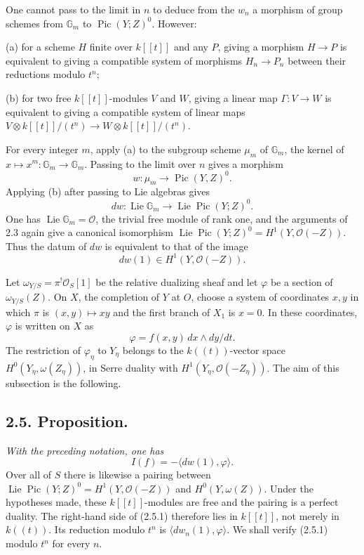 \documentclass[11pt,leqno]{article}
\DeclareMathOperator{\Lie}{Lie}
\DeclareMathOperator{\Pic}{Pic}
\newcommand{\OO}{\mathcal O}
\newcommand{\GG}{\mathbb G}
\begin{document}
One cannot pass to the limit in $n$ to deduce from the $w_n$ a morphism of group schemes from $\GG_m$ to $\Pic(Y;Z)^0$. However:

\noindent (a) for a scheme $H$ finite over $k[[t]]$ and any $P$, giving a morphism $H\to P$ is equivalent to giving a compatible system of morphisms $H_n\to P_n$ between their reductions modulo $t^n$;

\noindent (b) for two free $k[[t]]$-modules $V$ and $W$, giving a linear map $\Gamma:V\to W$ is equivalent to giving a compatible system of linear maps $V\otimes k[[t]]/(t^n)\to W\otimes k[[t]]/(t^n)$.

For every integer $m$, apply (a) to the subgroup scheme $\mu_m$ of $\GG_m$, the kernel of $x\mapsto x^m:\GG_m\to\GG_m$. Passing to the limit over $n$ gives a morphism
\begin{equation}
        w:\mu_m\longrightarrow\Pic(Y,Z)^0. \tag{2.4.9}
\end{equation}
Applying (b) after passing to Lie algebras gives
\begin{equation}
        dw:\Lie\GG_m\longrightarrow\Lie\Pic(Y;Z)^0. \tag{2.4.10}
\end{equation}
One has $\Lie\GG_m=\OO$, the trivial free module of rank one, and the arguments of 2.3 again give a canonical isomorphism $\Lie\Pic(Y;Z)^0=H^1(Y,\OO(-Z))$. Thus the datum of $dw$ is equivalent to that of the image
\begin{equation}
        dw(1)\in H^1(Y,\OO(-Z)). \tag{2.4.11}
\end{equation}

Let $\omega_{Y/S}=\pi^!\OO_S[1]$ be the relative dualizing sheaf and let $\varphi$ be a section of $\omega_{Y/S}(Z)$. On $X$, the completion of $Y$ at $O$, choose a system of coordinates
\clearpage
$x,y$ in which $\pi$ is $(x,y)\mapsto xy$ and the first branch of $X_1$ is $x=0$. In these coordinates, $\varphi$ is written on $X$ as
\[
        \varphi=f(x,y)\,dx\wedge dy/dt.
\]
The restriction of $\varphi_\eta$ to $Y_\eta$ belongs to the $k((t))$-vector space $H^0(Y_\eta,\omega(Z_\eta))$, in Serre duality with $H^1(Y_\eta,\OO(-Z_\eta))$. The aim of this subsection is the following.

\subsection*{2.5. Proposition.}
\emph{With the preceding notation, one has}
\begin{equation}
        I(f)=-\langle dw(1),\varphi\rangle. \tag{2.5.1}
\end{equation}
Over all of $S$ there is likewise a pairing between $\Lie\Pic(Y;Z)^0=H^1(Y,\OO(-Z))$ and $H^0(Y,\omega(Z))$. Under the hypotheses made, these $k[[t]]$-modules are free and the pairing is a perfect duality. The right-hand side of (2.5.1) therefore lies in $k[[t]]$, not merely in $k((t))$. Its reduction modulo $t^n$ is $\langle dw_n(1),\varphi\rangle$. We shall verify (2.5.1) modulo $t^n$ for every $n$.
\end{document}
